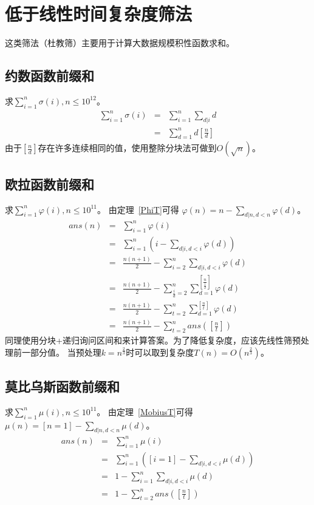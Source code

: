 \section{低于线性时间复杂度筛法}
这类筛法（杜教筛）主要用于计算大数据规模积性函数求和。
\subsection{约数函数前缀和}
求$\displaystyle \sum_{i=1}^n{\sigma(i)},n\leq 10^{12}$。
\begin{eqnarray*}
    \sum_{i=1}^n{\sigma(i)}&=&\sum_{i=1}^n{\sum_{d|i}d}\\
    &=&\sum_{d=1}^n{d[\frac{n}{d}]}
\end{eqnarray*}
由于$[\frac{n}{d}]$存在许多连续相同的值，使用整除分块法可做到$O(\sqrt{n})$。
\subsection{欧拉函数前缀和}
求$\displaystyle \sum_{i=1}^n{\varphi(i)},n\leq 10^{11}$。
由定理~\ref{PhiT}可得
$\displaystyle \varphi(n)=n-\sum_{d|n,d<n}{\varphi(d)}$。
\begin{eqnarray*}
    ans(n)&=&\sum_{i=1}^n{\varphi(i)}\\
    &=&\sum_{i=1}^n{\left(i-\sum_{d|i,d<i}{\varphi(d)}\right)}\\
    &=&\frac{n(n+1)}{2}-\sum_{i=2}^{n}{\sum_{d|i,d<i}{\varphi(d)}}\\
    &=&\frac{n(n+1)}{2}-\sum_{\frac{i}{d}=2}^n
    {\sum_{d=1}^{[\frac{n}{\frac{i}{d}}]}{\varphi(d)}}\\
    &=&\frac{n(n+1)}{2}-\sum_{t=2}^n
    {\sum_{d=1}^{[\frac{n}{t}]}{\varphi(d)}}\\
    &=&\frac{n(n+1)}{2}-\sum_{t=2}^n{ans([\frac{n}{t}])}
\end{eqnarray*}
同理使用分块+递归询问区间和来计算答案。为了降低复杂度，应该先线性筛预处理前一部分值。
当预处理$k=n^\frac{2}{3}$时可以取到复杂度$T(n)=O(n^\frac{2}{3})$。
\subsection{莫比乌斯函数前缀和}
求$\displaystyle \sum_{i=1}^n{\mu(i)},n\leq 10^{11}$。
由定理~\ref{MobiusT}可得
$\displaystyle \mu(n)=[n=1]-\sum_{d|n,d<n}{\mu(d)}$。
\begin{eqnarray*}
    ans(n)&=&\sum_{i=1}^n{\mu(i)}\\
    &=&\sum_{i=1}^n{\left([i=1]-\sum_{d|i,d<i}{\mu(d)}\right)}\\
    &=&1-\sum_{i=1}^n{\sum_{d|i,d<i}{\mu(d)}}\\
    &=&1-\sum_{t=2}^n{ans([\frac{n}{t}])}
\end{eqnarray*}
